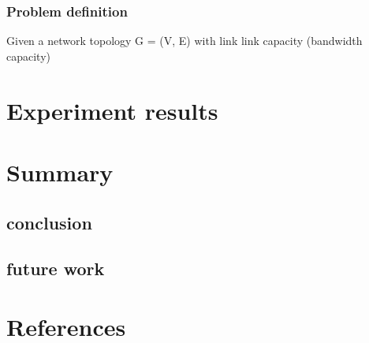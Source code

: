 \documentclass[a4paper,12pt]{report}
\begin{document}
\begin{large}
    \subsection{Problem definition}
    \qquad Given a network topology G = (V, E) with link link capacity (bandwidth capacity) 
  \chapter{Experiment results}
  \chapter{Summary}
    \section{conclusion}
    \section{future work}
  \chapter{References}
  \end{large}
  
\end{document}
